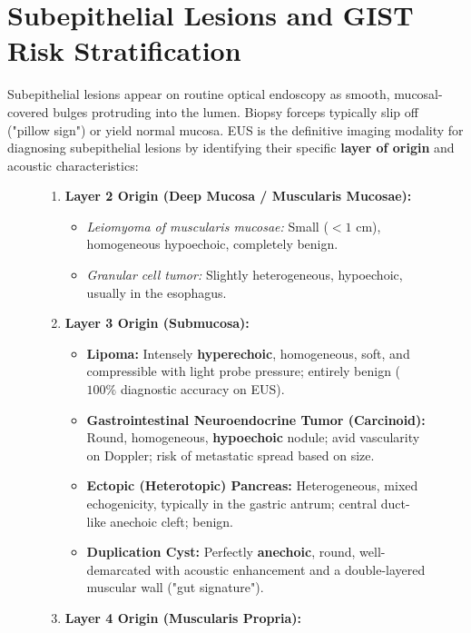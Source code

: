 \documentclass[11pt,a4paper]{article}
\begin{document}
\section{Subepithelial Lesions and GIST Risk Stratification}
Subepithelial lesions appear on routine optical endoscopy as smooth, mucosal-covered bulges protruding into the lumen. Biopsy forceps typically slip off ("pillow sign") or yield normal mucosa. EUS is the definitive imaging modality for diagnosing subepithelial lesions by identifying their specific \textbf{layer of origin} and acoustic characteristics:

\begin{figure}[htbp]
\centering
\begin{tcolorbox}[colback=purple!5!white,colframe=purple!60!black,title=\textbf{Algorithmic Differentiation of Subepithelial Lesions by Wall Layer},width=\linewidth]
\small
\begin{enumerate}[leftmargin=1.5em]
    \item \textbf{Layer 2 Origin (Deep Mucosa / Muscularis Mucosae):}
    \begin{itemize}
        \item \textit{Leiomyoma of muscularis mucosae:} Small ($< 1\text{ cm}$), homogeneous hypoechoic, completely benign.
        \item \textit{Granular cell tumor:} Slightly heterogeneous, hypoechoic, usually in the esophagus.
    \end{itemize}
    \item \textbf{Layer 3 Origin (Submucosa):}
    \begin{itemize}
        \item \textbf{Lipoma:} Intensely \textbf{hyperechoic}, homogeneous, soft, and compressible with light probe pressure; entirely benign ($100\%$ diagnostic accuracy on EUS).
        \item \textbf{Gastrointestinal Neuroendocrine Tumor (Carcinoid):} Round, homogeneous, \textbf{hypoechoic} nodule; avid vascularity on Doppler; risk of metastatic spread based on size.
        \item \textbf{Ectopic (Heterotopic) Pancreas:} Heterogeneous, mixed echogenicity, typically in the gastric antrum; central duct-like anechoic cleft; benign.
        \item \textbf{Duplication Cyst:} Perfectly \textbf{anechoic}, round, well-demarcated with acoustic enhancement and a double-layered muscular wall ("gut signature").
    \end{itemize}
    \item \textbf{Layer 4 Origin (Muscularis Propria):}

\end{enumerate}
\end{tcolorbox}
\end{figure}
\end{document}
